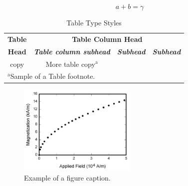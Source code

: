 \documentclass[conference]{IEEEtran}
\begin{document}
\begin{equation}
    a+b=\gamma\label{eq}
\end{equation}

\begin{table}[htbp]
    \caption{Table Type Styles}
    \begin{center}
        \begin{tabular}{|c|c|c|c|}
            \hline
            \textbf{Table} & \multicolumn{3}{|c|}{\textbf{Table Column Head}}                                                         \\
            \cline{2-4}
            \textbf{Head}  & \textbf{\textit{Table column subhead}}           & \textbf{\textit{Subhead}} & \textbf{\textit{Subhead}} \\
            \hline
            copy           & More table copy$^{\mathrm{a}}$                   &                           &                           \\
            \hline
            \multicolumn{4}{l}{$^{\mathrm{a}}$Sample of a Table footnote.}
        \end{tabular}
        \label{tab1}
    \end{center}
\end{table}

\begin{figure}[htbp]
    \centerline{\includegraphics[width=0.5\textwidth]{Photos/fig1.png}}
    \caption{Example of a figure caption.}
    \label{fig}
\end{figure}


\end{document}

